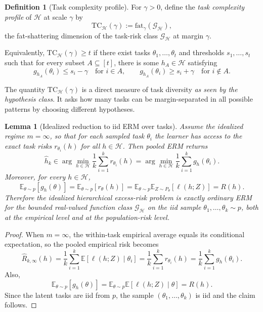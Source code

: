 \documentclass[11pt]{article}
\newtheorem{lemma}{Lemma}
\theoremstyle{definition}
\newtheorem{definition}{Definition}
\newcommand{\E}{\mathbb{E}}
\begin{document}
\begin{definition}[Task complexity profile]
For $\gamma > 0$, define the \emph{task complexity profile} of $\mathcal{H}$ at scale $\gamma$ by
\[
\mathrm{TC}_{\mathcal{H}}(\gamma)
:=
\mathrm{fat}_{\gamma}(\mathcal{G}_{\mathcal{H}}),
\]
the fat-shattering dimension of the task-risk class $\mathcal{G}_{\mathcal{H}}$ at margin $\gamma$.

Equivalently, $\mathrm{TC}_{\mathcal{H}}(\gamma) \ge t$ if there exist tasks $\theta_1,\dots,\theta_t$ and thresholds $s_1,\dots,s_t$ such that for every subset $A \subseteq [t]$, there is some $h_A \in \mathcal{H}$ satisfying
\[
g_{h_A}(\theta_i) \le s_i - \gamma
\quad \text{for } i \in A,
\qquad
g_{h_A}(\theta_i) \ge s_i + \gamma
\quad \text{for } i \notin A.
\]
\end{definition}

The quantity $\mathrm{TC}_{\mathcal{H}}(\gamma)$ is a direct measure of task diversity \emph{as seen by the hypothesis class}. It asks how many tasks can be margin-separated in all possible patterns by choosing different hypotheses.

\begin{lemma}[Idealized reduction to iid ERM over tasks]
\label{lem:task-reduction}
Assume the idealized regime $m=\infty$, so that for each sampled task $\theta_i$ the learner has access to the exact task risks $r_{\theta_i}(h)$ for all $h \in \mathcal{H}$. Then pooled ERM returns
\[
\widehat{h}_k \in \arg\min_{h \in \mathcal{H}} \frac{1}{k}\sum_{i=1}^k r_{\theta_i}(h)
=
\arg\min_{h \in \mathcal{H}} \frac{1}{k}\sum_{i=1}^k g_h(\theta_i).
\]
Moreover, for every $h \in \mathcal{H}$,
\[
\E_{\theta \sim p}[g_h(\theta)]
=
\E_{\theta \sim p}[r_{\theta}(h)]
=
\E_{\theta \sim p}\E_{Z \sim P_{\theta}}[\ell(h;Z)]
=
R(h).
\]
Therefore the idealized hierarchical excess-risk problem is exactly ordinary ERM for the bounded real-valued function class $\mathcal{G}_{\mathcal{H}}$ on the iid sample $\theta_1,\dots,\theta_k \sim p$, both at the empirical level and at the population-risk level.
\end{lemma}

\begin{proof}
When $m=\infty$, the within-task empirical average equals its conditional expectation, so the pooled empirical risk becomes
\[
\widehat{R}_{k,\infty}(h)
=
\frac{1}{k}\sum_{i=1}^k \E[\ell(h;Z)\mid \theta_i]
=
\frac{1}{k}\sum_{i=1}^k r_{\theta_i}(h)
=
\frac{1}{k}\sum_{i=1}^k g_h(\theta_i).
\]
Also,
\[
\E_{\theta \sim p}[g_h(\theta)]
=
\E_{\theta \sim p}\E[\ell(h;Z)\mid \theta]
=
R(h).
\]
Since the latent tasks are iid from $p$, the sample $(\theta_1,\dots,\theta_k)$ is iid and the claim follows.
\end{proof}
\end{document}
